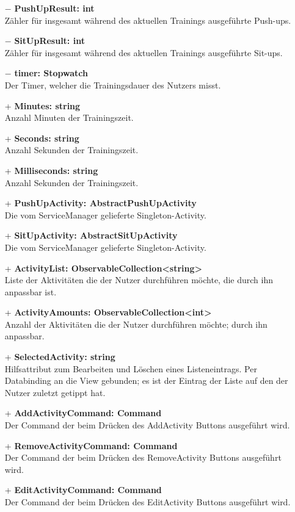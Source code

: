 \documentclass[a4paper,12pt]{article}
\begin{document}
\begin{itemize}
	\item[$-$] \textbf{PushUpResult: int} \\ Zähler für insgesamt während des aktuellen Trainings ausgeführte Push-ups. 
	\item[$-$] \textbf{SitUpResult: int} \\ Zähler für insgesamt während des aktuellen Trainings ausgeführte Sit-ups. 
	\item[$-$] \textbf{timer: Stopwatch} \\ Der Timer, welcher die Trainingsdauer des Nutzers misst. 
	\item[+] \textbf{Minutes: string} \\ Anzahl Minuten der Trainingszeit. 
	\item[+] \textbf{Seconds: string} \\  Anzahl Sekunden der Trainingszeit. 
	\item[+] \textbf{Milliseconds: string} \\ Anzahl Sekunden der Trainingszeit. 
	\item[+] \textbf{PushUpActivity: AbstractPushUpActivity} \\ Die vom ServiceManager gelieferte Singleton-Activity.
	\item[+] \textbf{SitUpActivity: AbstractSitUpActivity} \\ Die vom ServiceManager gelieferte Singleton-Activity.
	\item[+] \textbf{ActivityList: ObservableCollection<string>} \\ Liste der Aktivitäten die der Nutzer durchführen möchte, die durch ihn anpassbar ist. 
	\item[+] \textbf{ActivityAmounts: ObservableCollection<int>} \\ Anzahl der Aktivitäten die der Nutzer durchführen möchte; durch ihn anpassbar. 
	\item[+] \textbf{SelectedActivity: string} \\ Hilfsattribut zum Bearbeiten und Löschen eines Listeneintrags. Per Databinding an die View gebunden; es ist der Eintrag der Liste auf den der Nutzer zuletzt getippt hat. 
	\item[+] \textbf{AddActivityCommand: Command} \\ Der Command der beim Drücken des AddActivity Buttons ausgeführt wird. 
	\item[+] \textbf{RemoveActivityCommand: Command} \\ Der Command der beim Drücken des RemoveActivity Buttons ausgeführt wird. 
	\item[+] \textbf{EditActivityCommand: Command} \\ Der Command der beim Drücken des EditActivity Buttons ausgeführt wird. 
\end{itemize}
\end{document}
